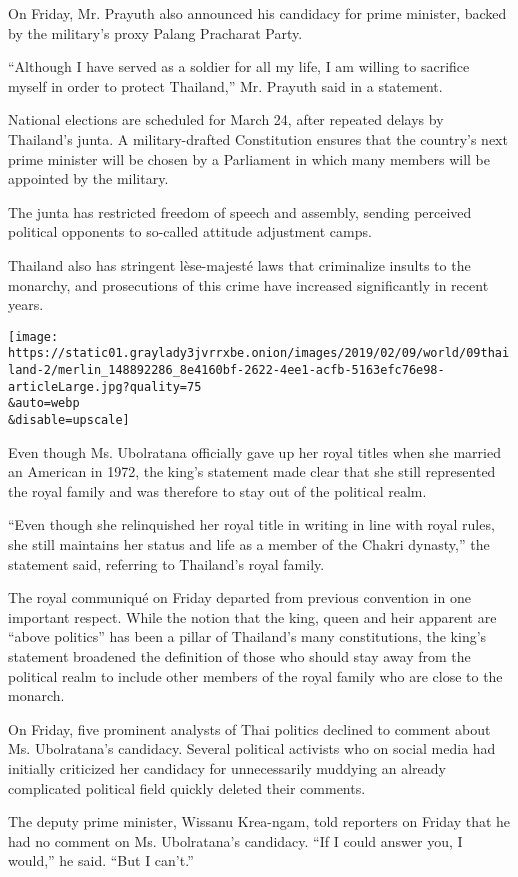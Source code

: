 On Friday, Mr. Prayuth also announced his candidacy for prime minister,
backed by the military's proxy Palang Pracharat Party.

``Although I have served as a soldier for all my life, I am willing to
sacrifice myself in order to protect Thailand,'' Mr. Prayuth said in a
statement.

National elections are scheduled for March 24, after repeated delays by
Thailand's junta. A military-drafted Constitution ensures that the
country's next prime minister will be chosen by a Parliament in which
many members will be appointed by the military.

The junta has restricted freedom of speech and assembly, sending
perceived political opponents to so-called attitude adjustment camps.

Thailand also has stringent lèse-majesté laws that criminalize insults
to the monarchy, and prosecutions of this crime have increased
significantly in recent years.

\texttt{[image: https://static01.graylady3jvrrxbe.onion/images/2019/02/09/world/09thailand-2/merlin\_148892286\_8e4160bf-2622-4ee1-acfb-5163efc76e98-articleLarge.jpg?quality=75\\\&auto=webp\\\&disable=upscale]}

Even though Ms. Ubolratana officially gave up her royal titles when she
married an American in 1972, the king's statement made clear that she
still represented the royal family and was therefore to stay out of the
political realm.

``Even though she relinquished her royal title in writing in line with
royal rules, she still maintains her status and life as a member of the
Chakri dynasty,'' the statement said, referring to Thailand's royal
family.

The royal communiqué on Friday departed from previous convention in one
important respect. While the notion that the king, queen and heir
apparent are ``above politics'' has been a pillar of Thailand's many
constitutions, the king's statement broadened the definition of those
who should stay away from the political realm to include other members
of the royal family who are close to the monarch.

On Friday, five prominent analysts of Thai politics declined to comment
about Ms. Ubolratana's candidacy. Several political activists who on
social media had initially criticized her candidacy for unnecessarily
muddying an already complicated political field quickly deleted their
comments.

The deputy prime minister, Wissanu Krea-ngam, told reporters on Friday
that he had no comment on Ms. Ubolratana's candidacy. ``If I could
answer you, I would,'' he said. ``But I can't.''

